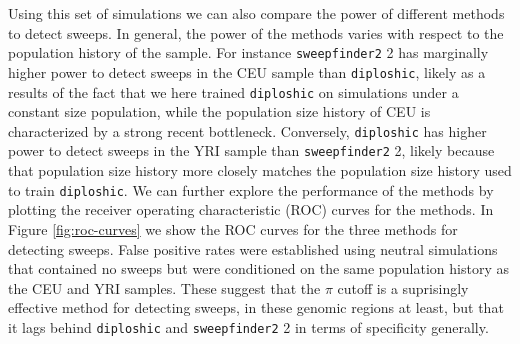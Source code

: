 \documentclass[hidelinks]{article}
\newcommand{\stdpopsim}{\texttt{stdpopsim}\xspace}
\newcommand{\sweepfinder}{\texttt{sweepfinder2}\xspace}
\newcommand{\diploshic}{\texttt{diploshic}\xspace}
\begin{document}
    Using this set of simulations we can also compare the power of different methods to detect sweeps.
    In general, the power of the methods varies with respect to the population history of the sample.
    For instance \sweepfinder2 has marginally higher power to detect sweeps in the CEU sample than \diploshic,
    likely as a results of the fact that we here trained \diploshic on simulations under a constant size population,
    while the population size history of CEU is characterized by a strong recent bottleneck.
    Conversely, \diploshic has higher power to detect sweeps in the YRI sample than \sweepfinder2,
    likely because that population size history more closely matches the population size history used to train \diploshic.
    We can further explore the performance of the methods by plotting the receiver operating characteristic (ROC) curves for the methods.
    In Figure \ref{fig:roc-curves} we show the ROC curves for the three methods for detecting sweeps.
    False positive rates were established using neutral simulations that contained no sweeps
    but were conditioned on the same population history as the CEU and YRI samples.
    These suggest that the $\pi$ cutoff is a suprisingly effective method for detecting sweeps,
    in these genomic regions at least, but that it lags behind \diploshic and \sweepfinder2 in terms of specificity
    generally. 
\end{document}
